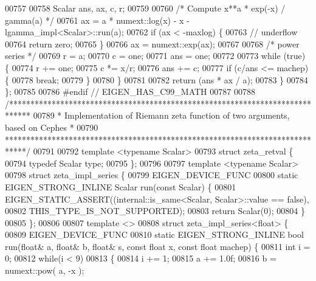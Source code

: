 \begin{DoxyCode}
00757 
00758     Scalar ans, ax, c, r;
00759 
00760     \textcolor{comment}{/* Compute  x**a * exp(-x) / gamma(a)  */}
00761     ax = a * numext::log(x) - x - lgamma\_impl<Scalar>::run(a);
00762     \textcolor{keywordflow}{if} (ax < -maxlog) \{
00763       \textcolor{comment}{// underflow}
00764       \textcolor{keywordflow}{return} zero;
00765     \}
00766     ax = numext::exp(ax);
00767 
00768     \textcolor{comment}{/* power series */}
00769     r = a;
00770     c = one;
00771     ans = one;
00772 
00773     \textcolor{keywordflow}{while} (\textcolor{keyword}{true}) \{
00774       r += one;
00775       c *= x/r;
00776       ans += c;
00777       \textcolor{keywordflow}{if} (c/ans <= machep) \{
00778         \textcolor{keywordflow}{break};
00779       \}
00780     \}
00781 
00782     \textcolor{keywordflow}{return} (ans * ax / a);
00783   \}
00784 \};
00785 
00786 \textcolor{preprocessor}{#endif  // EIGEN\_HAS\_C99\_MATH}
00787 
00788 \textcolor{comment}{/*****************************************************************************}
00789 \textcolor{comment}{ * Implementation of Riemann zeta function of two arguments, based on Cephes *}
00790 \textcolor{comment}{ *****************************************************************************/}
00791 
00792 \textcolor{keyword}{template} <\textcolor{keyword}{typename} Scalar>
00793 \textcolor{keyword}{struct }zeta\_retval \{
00794     \textcolor{keyword}{typedef} Scalar type;
00795 \};
00796 
00797 \textcolor{keyword}{template} <\textcolor{keyword}{typename} Scalar>
00798 \textcolor{keyword}{struct }zeta\_impl\_series \{
00799   EIGEN\_DEVICE\_FUNC
00800   \textcolor{keyword}{static} EIGEN\_STRONG\_INLINE Scalar run(\textcolor{keyword}{const} Scalar) \{
00801     EIGEN\_STATIC\_ASSERT((internal::is\_same<Scalar, Scalar>::value == \textcolor{keyword}{false}),
00802                         THIS\_TYPE\_IS\_NOT\_SUPPORTED);
00803     \textcolor{keywordflow}{return} Scalar(0);
00804   \}
00805 \};
00806 
00807 \textcolor{keyword}{template} <>
00808 \textcolor{keyword}{struct }zeta\_impl\_series<float> \{
00809   EIGEN\_DEVICE\_FUNC
00810   \textcolor{keyword}{static} EIGEN\_STRONG\_INLINE \textcolor{keywordtype}{bool} run(\textcolor{keywordtype}{float}& a, \textcolor{keywordtype}{float}& b, \textcolor{keywordtype}{float}& s, \textcolor{keyword}{const} \textcolor{keywordtype}{float} x, \textcolor{keyword}{const} \textcolor{keywordtype}{float} machep) \{
00811     \textcolor{keywordtype}{int} i = 0;
00812     \textcolor{keywordflow}{while}(i < 9)
00813     \{
00814         i += 1;
00815         a += 1.0f;
00816         b = numext::pow( a, -x );

\end{DoxyCode}
